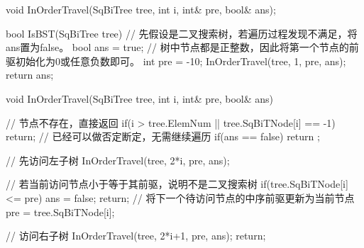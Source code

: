 \begin{cppcode}
    void InOrderTravel(SqBiTree tree, int i, int& pre, bool& ans);

    bool IsBST(SqBiTree tree) {
        // 先假设是二叉搜索树，若遍历过程发现不满足，将ans置为false。
        bool ans = true;
        // 树中节点都是正整数，因此将第一个节点的前驱初始化为0或任意负数即可。
        int pre = -10;
        InOrderTravel(tree, 1, pre, ans);
        return ans;
    }

    void InOrderTravel(SqBiTree tree, int i, int& pre, bool& ans) {
        // 节点不存在，直接返回
        if(i > tree.ElemNum || tree.SqBiTNode[i] == -1) return;
        // 已经可以做否定断定，无需继续遍历
        if(ans == false) return ;

        // 先访问左子树
        InOrderTravel(tree, 2*i, pre, ans);

        // 若当前访问节点小于等于其前驱，说明不是二叉搜索树
        if(tree.SqBiTNode[i] <= pre) {
            ans = false;
            return;
        }
        // 将下一个待访问节点的中序前驱更新为当前节点
        pre = tree.SqBiTNode[i];

        // 访问右子树
        InOrderTravel(tree, 2*i+1, pre, ans);
        return;
    }
\end{cppcode}




